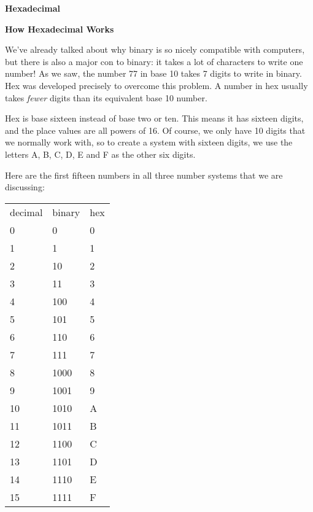 \documentclass{article}
\begin{document}
\newpage


\noindent\textbf{Hexadecimal}\newline


\noindent\textbf{How Hexadecimal Works}

\vspace{0.3in}

We've already talked about why binary is so nicely compatible with computers, but there is also a major con to binary: it takes a lot of characters to write one number! As we saw, the number 77 in base 10 takes 7 digits to write in binary. Hex was developed precisely to overcome this problem. A number in hex usually takes \textit{fewer} digits than its equivalent base 10 number. 

Hex is base sixteen instead of base two or ten. This means it has sixteen digits, and the place values are all powers of 16. Of course, we only have 10 digits that we normally work with, so to create a system with sixteen digits, we use the letters A, B, C, D, E and F as the other six digits.

Here are the first fifteen numbers in all three number systems that we are discussing:

\vspace{0.2in}

\begin{center}
\begin{tabular}{lll}
decimal & binary & hex \\
0 & 0 & 0 \\
1 & 1 & 1 \\
2 & 10 & 2 \\
3 & 11 & 3 \\
4 & 100 & 4 \\
5 & 101 & 5 \\
6 & 110 & 6 \\
7 & 111 & 7 \\
8 & 1000 & 8 \\
9 & 1001 & 9 \\
10 & 1010 & A \\
11 & 1011 & B \\
12 & 1100 & C \\
13 & 1101 & D \\
14 & 1110 & E \\
15 & 1111 & F \\
\end{tabular}
\end{center}
 
\vspace{0.3in}
\end{document}
